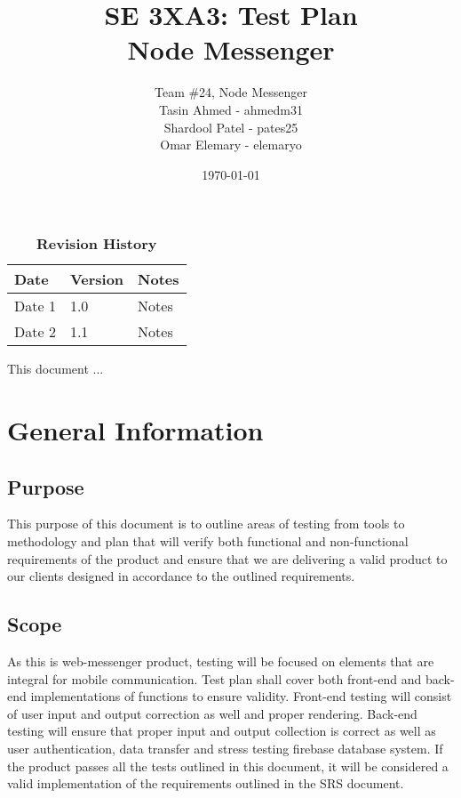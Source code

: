\documentclass[12pt, titlepage]{article}
\title{SE 3XA3: Test Plan\\Node Messenger}
\author{Team \#24, Node Messenger
		\\ Tasin Ahmed - ahmedm31
		\\ Shardool Patel - pates25
		\\ Omar Elemary - elemaryo
}
\date{\today}
\begin{document}
\maketitle

\tableofcontents
\listoftables
\listoffigures

\begin{table}[bp]
\caption{\bf Revision History}
\begin{tabularx}{\textwidth}{p{3cm}p{2cm}X}
\toprule {\bf Date} & {\bf Version} & {\bf Notes}\\
\midrule
Date 1 & 1.0 & Notes\\
Date 2 & 1.1 & Notes\\
\bottomrule
\end{tabularx}
\end{table}

\newpage


This document ...

\section{General Information}


\subsection{Purpose}
This purpose of this document is to outline areas of testing from tools to methodology and plan that will verify both functional and non-functional requirements of the product and ensure that we are delivering a valid product to our clients designed in accordance to the outlined requirements.
\subsection{Scope}
As this is web-messenger product, testing will be focused on elements that are integral for mobile communication. Test plan shall cover both front-end and back-end implementations of functions to ensure validity. Front-end testing will consist of user input and output correction as well and proper rendering. Back-end testing will ensure that proper input and output collection is correct as well as user authentication, data transfer and stress testing firebase database system. If the product passes all the tests outlined in this document, it will be considered a valid implementation of the requirements outlined in the SRS document.
\end{document}
